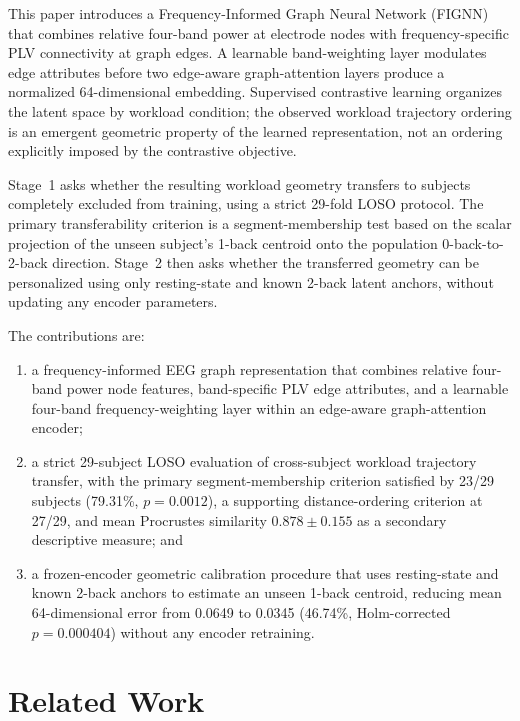 \documentclass{ieeeaccess}
\begin{document}
This paper introduces a Frequency-Informed Graph Neural Network (FIGNN) that
combines relative four-band power at electrode nodes with frequency-specific
PLV connectivity at graph edges. A learnable band-weighting layer modulates
edge attributes before two edge-aware graph-attention layers produce a
normalized 64-dimensional embedding. Supervised contrastive learning
organizes the latent space by workload condition; the observed workload
trajectory ordering is an emergent geometric property of the learned
representation, not an ordering explicitly imposed by the contrastive objective.

Stage~1 asks whether the resulting workload geometry transfers to subjects
completely excluded from training, using a strict 29-fold LOSO protocol.
The primary transferability criterion is a segment-membership test based on
the scalar projection of the unseen subject's 1-back centroid onto the
population 0-back-to-2-back direction. Stage~2 then asks whether the
transferred geometry can be personalized using only resting-state and known
2-back latent anchors, without updating any encoder parameters.

The contributions are:
\begin{enumerate}
  \item a frequency-informed EEG graph representation that combines relative
        four-band power node features, band-specific PLV edge attributes, and
        a learnable four-band frequency-weighting layer within an edge-aware
        graph-attention encoder;
  \item a strict 29-subject LOSO evaluation of cross-subject workload
        trajectory transfer, with the primary segment-membership criterion
        satisfied by 23/29 subjects (79.31\%, $p=0.0012$), a supporting
        distance-ordering criterion at 27/29, and mean Procrustes similarity
        $0.878\pm0.155$ as a secondary descriptive measure; and
  \item a frozen-encoder geometric calibration procedure that uses resting-state
        and known 2-back anchors to estimate an unseen 1-back centroid, reducing
        mean 64-dimensional error from 0.0649 to 0.0345 (46.74\%,
        Holm-corrected $p=0.000404$) without any encoder retraining.
\end{enumerate}

\section{Related Work}
\label{sec:related}
\end{document}
